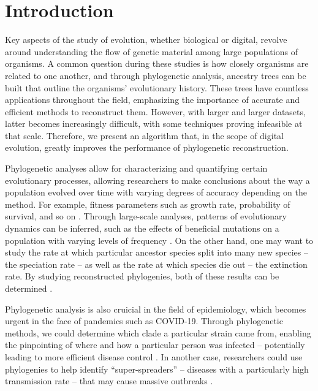 \section{Introduction} \label{sec:introduction}

Key aspects of the study of evolution, whether biological or digital, revolve around understanding the flow of genetic material among large populations of organisms.
A common question during these studies is how closely organisms are related to one another, and through phylogenetic analysis, ancestry trees can be built that outline the organisms' evolutionary history.
These trees have countless applications throughout the field, emphasizing the importance of accurate and efficient methods to reconstruct them.
However, with larger and larger datasets, latter becomes increasingly difficult, with some techniques proving infeasible at that scale.
Therefore, we present an algorithm that, in the scope of digital evolution, greatly improves the performance of phylogenetic reconstruction.

Phylogenetic analyses allow for characterizing and quantifying certain evolutionary processes, allowing researchers to make conclusions about the way a population evolved over time with varying degrees of accuracy depending on the method.
For example, fitness parameters such as growth rate, probability of survival, and so on \citep{genthon2023cell}.
Through large-scale analyses, patterns of evolutionary dynamics can be inferred, such as the effects of beneficial mutations on a population with varying levels of frequency \citep{levy2015quantitative}.
On the other hand, one may want to study the rate at which particular ancestor species split into many new species -- the speciation rate -- as well as the rate at which species die out -- the extinction rate.
By studying reconstructed phylogenies, both of these results can be determined \citep{stadler2013recovering}.

Phylogenetic analysis is also cruicial in the field of epidemiology, which becomes urgent in the face of pandemics such as COVID-19.
Through phylogenetic methods, we could determine which clade a particular strain came from, enabling the pinpointing of where and how a particular person was infected -- potentially leading to more efficient disease control \citep{wang2020role}.
In another case, researchers could use phylogenies to help identify ``super-spreaders'' -- diseases with a particularly high transmission rate -- that may cause massive outbreaks \citep{colijn2014phylogenetic}.

